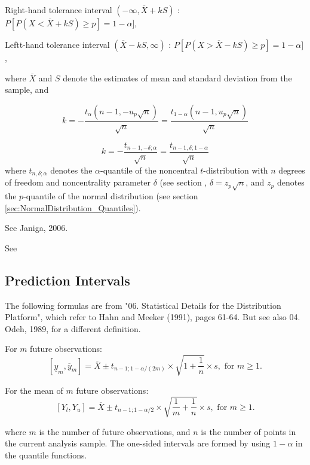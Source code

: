 Right-hand tolerance interval $(-\infty, \overline{X} + kS)$ : $P[P(X<\overline{X} + kS) \geq p] =1-\alpha]$,

Leftt-hand tolerance interval $(\overline{X} - kS, \infty)$ : $P[P(X>\overline{X} - kS) \geq p] =1-\alpha]$,

where $\overline{X}$ and $S$ denote the estimates of mean and standard deviation from the sample, and 

\begin{equation}
	k=-\frac{t_\alpha(n-1,-u_p \sqrt{n})}{\sqrt{n}} =\frac{t_{1-\alpha}(n-1,u_p \sqrt{n})}{\sqrt{n}}
\end{equation}

\begin{equation}
	k=-\frac{t_{n-1,-\delta;\alpha}}{\sqrt{n}} =\frac{t_{n-1,\delta;1-\alpha}}{\sqrt{n}}
\end{equation}
where $t_{n,\delta;\alpha}$ denotes the $\alpha$-quantile of the noncentral $t$-distribution with $n$ degrees of freedom and noncentrality parameter $\delta$ (see section 
, $\delta=z_p \sqrt{n}$, and $z_p$ denotes the $p$-quantile of the normal distribution (see section \ref{sec:NormalDistribution_Quantiles}).

See Janiga, 2006.

See \cite{odeh_tables_1980}



\subsection{Prediction Intervals}
The following formulas are from "06. Statistical Details for the Distribution Platform", which refer to  Hahn and Meeker (1991), pages 61-64. But see also 04. Odeh, 1989, for a different definition.

For $m$ future observations:
\begin{equation}
	\left[\underline{y}_m,\overline{y}_m \right] = \overline{X}\pm t_{n-1;1-\alpha/(2m)} \times \sqrt{1+\frac{1}{n}} \times s, \text{ for } m\geq1.
\end{equation}


For the mean of $m$ future observations:
\begin{equation}
	\left[Y_l,Y_u\right] = \overline{X}\pm t_{n-1;1-\alpha/2} \times \sqrt{\frac{1}{m}+\frac{1}{n}} \times s, \text{ for } m\geq1.
\end{equation}

where $m$ is the number of future observations, and $n$ is the number of points in the current analysis sample. The one-sided intervals are formed by using $1-\alpha$ in the quantile functions.



